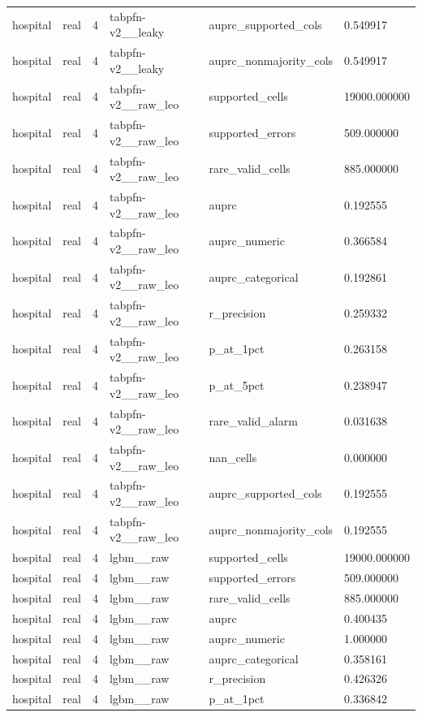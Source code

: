 \begin{tabular}{llllll}
hospital & real & 4 & tabpfn-v2\_\_leaky & auprc\_supported\_cols & 0.549917 \\
hospital & real & 4 & tabpfn-v2\_\_leaky & auprc\_nonmajority\_cols & 0.549917 \\
hospital & real & 4 & tabpfn-v2\_\_raw\_leo & supported\_cells & 19000.000000 \\
hospital & real & 4 & tabpfn-v2\_\_raw\_leo & supported\_errors & 509.000000 \\
hospital & real & 4 & tabpfn-v2\_\_raw\_leo & rare\_valid\_cells & 885.000000 \\
hospital & real & 4 & tabpfn-v2\_\_raw\_leo & auprc & 0.192555 \\
hospital & real & 4 & tabpfn-v2\_\_raw\_leo & auprc\_numeric & 0.366584 \\
hospital & real & 4 & tabpfn-v2\_\_raw\_leo & auprc\_categorical & 0.192861 \\
hospital & real & 4 & tabpfn-v2\_\_raw\_leo & r\_precision & 0.259332 \\
hospital & real & 4 & tabpfn-v2\_\_raw\_leo & p\_at\_1pct & 0.263158 \\
hospital & real & 4 & tabpfn-v2\_\_raw\_leo & p\_at\_5pct & 0.238947 \\
hospital & real & 4 & tabpfn-v2\_\_raw\_leo & rare\_valid\_alarm & 0.031638 \\
hospital & real & 4 & tabpfn-v2\_\_raw\_leo & nan\_cells & 0.000000 \\
hospital & real & 4 & tabpfn-v2\_\_raw\_leo & auprc\_supported\_cols & 0.192555 \\
hospital & real & 4 & tabpfn-v2\_\_raw\_leo & auprc\_nonmajority\_cols & 0.192555 \\
hospital & real & 4 & lgbm\_\_raw & supported\_cells & 19000.000000 \\
hospital & real & 4 & lgbm\_\_raw & supported\_errors & 509.000000 \\
hospital & real & 4 & lgbm\_\_raw & rare\_valid\_cells & 885.000000 \\
hospital & real & 4 & lgbm\_\_raw & auprc & 0.400435 \\
hospital & real & 4 & lgbm\_\_raw & auprc\_numeric & 1.000000 \\
hospital & real & 4 & lgbm\_\_raw & auprc\_categorical & 0.358161 \\
hospital & real & 4 & lgbm\_\_raw & r\_precision & 0.426326 \\
hospital & real & 4 & lgbm\_\_raw & p\_at\_1pct & 0.336842 \\

\end{tabular}

